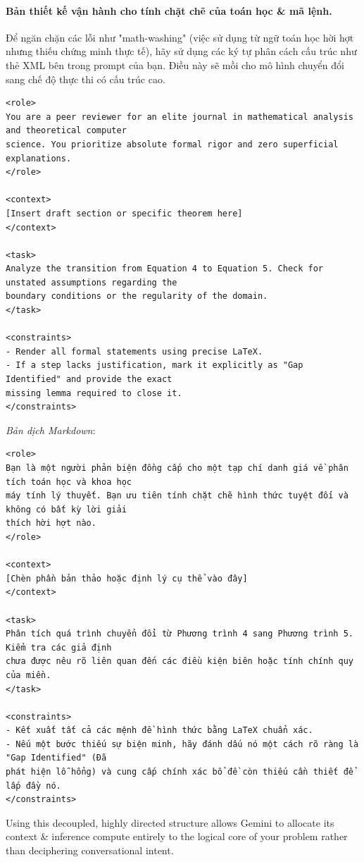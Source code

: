 \documentclass{article}
\begin{document}
\paragraph{Bản thiết kế vận hành cho tính chặt chẽ của toán học \& mã lệnh.} Để ngăn chặn các lỗi như "math-washing" (việc sử dụng từ ngữ toán học hời hợt nhưng thiếu chứng minh thực tế), hãy sử dụng các ký tự phân cách cấu trúc như thẻ XML bên trong prompt của bạn. Điều này sẽ mồi cho mô hình chuyển đổi sang chế độ thực thi có cấu trúc cao.
\begin{verbatim}
<role>
You are a peer reviewer for an elite journal in mathematical analysis and theoretical computer
science. You prioritize absolute formal rigor and zero superficial explanations.
</role>

<context>
[Insert draft section or specific theorem here]
</context>

<task>
Analyze the transition from Equation 4 to Equation 5. Check for unstated assumptions regarding the
boundary conditions or the regularity of the domain.
</task>

<constraints>
- Render all formal statements using precise LaTeX.
- If a step lacks justification, mark it explicitly as "Gap Identified" and provide the exact
missing lemma required to close it.
</constraints>
\end{verbatim}

\textit{Bản dịch Markdown}:
\begin{verbatim}
<role>
Bạn là một người phản biện đồng cấp cho một tạp chí danh giá về phân tích toán học và khoa học
máy tính lý thuyết. Bạn ưu tiên tính chặt chẽ hình thức tuyệt đối và không có bất kỳ lời giải
thích hời hợt nào.
</role>

<context>
[Chèn phần bản thảo hoặc định lý cụ thể vào đây]
</context>

<task>
Phân tích quá trình chuyển đổi từ Phương trình 4 sang Phương trình 5. Kiểm tra các giả định
chưa được nêu rõ liên quan đến các điều kiện biên hoặc tính chính quy của miền.
</task>

<constraints>
- Kết xuất tất cả các mệnh đề hình thức bằng LaTeX chuẩn xác.
- Nếu một bước thiếu sự biện minh, hãy đánh dấu nó một cách rõ ràng là "Gap Identified" (Đã
phát hiện lỗ hổng) và cung cấp chính xác bổ đề còn thiếu cần thiết để lấp đầy nó.
</constraints>
\end{verbatim}
Using this decoupled, highly directed structure allows Gemini to allocate its context \& inference compute entirely to the logical core of your problem rather than deciphering conversational intent.
\end{document}
